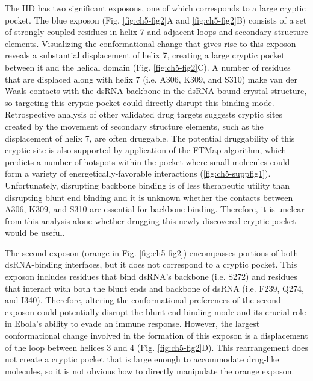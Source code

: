 \documentclass[../main.tex]{subfiles}
\begin{document}
        The IID has two significant exposons, one of which corresponds to a large cryptic pocket. The blue exposon (Fig. \ref{fig:ch5-fig2}A and \ref{fig:ch5-fig2}B) consists of a set of strongly-coupled residues in helix 7 and adjacent loops and secondary structure elements. Visualizing the conformational change that gives rise to this exposon reveals a substantial displacement of helix 7, creating a large cryptic pocket between it and the helical domain (Fig. \ref{fig:ch5-fig2}C). A number of residues that are displaced along with helix 7 (i.e. A306, K309, and S310) make van der Waals contacts with the dsRNA backbone in the dsRNA-bound crystal structure\cite{leung_structural_2010}, so targeting this cryptic pocket could directly disrupt this binding mode. Retrospective analysis of other validated drug targets suggests cryptic sites created by the movement of secondary structure elements, such as the displacement of helix 7, are often druggable\cite{Beglov:2018dm}. The potential druggability of this cryptic site is also supported by application of the FTMap algorithm\cite{ngan_ftmap:_2012,kozakov_ftmap_2015}, which predicts a number of hotspots within the pocket where small molecules could form a variety of energetically-favorable interactions (\ref{fig:ch5-suppfig1}). Unfortunately, disrupting backbone binding is of less therapeutic utility than disrupting blunt end binding and it is unknown whether the contacts between A306, K309, and S310 are essential for backbone binding. Therefore, it is unclear from this analysis alone whether drugging this newly discovered cryptic pocket would be useful.

        The second exposon (orange in Fig. \ref{fig:ch5-fig2}) encompasses portions of both dsRNA-binding interfaces, but it does not correspond to a cryptic pocket. This exposon includes residues that bind dsRNA’s backbone (i.e. S272) and residues that interact with both the blunt ends and backbone of dsRNA (i.e. F239, Q274, and I340)\cite{leung_structural_2010}. Therefore, altering the conformational preferences of the second exposon could potentially disrupt the blunt end-binding mode and its crucial role in Ebola’s ability to evade an immune response. However, the largest conformational change involved in the formation of this exposon is a displacement of the loop between helices 3 and 4 (Fig. \ref{fig:ch5-fig2}D). This rearrangement does not create a cryptic pocket that is large enough to accommodate drug-like molecules, so it is not obvious how to directly manipulate the orange exposon.
\end{document}
